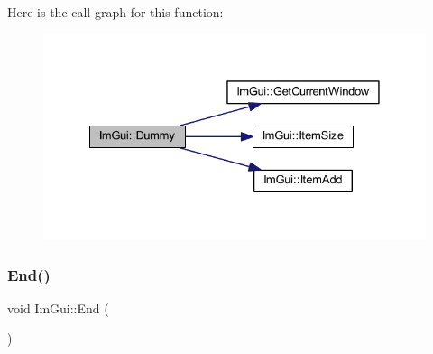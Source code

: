 Here is the call graph for this function\+:
\nopagebreak
\begin{figure}[H]
\begin{center}
\leavevmode
\includegraphics[width=328pt]{namespace_im_gui_a8b0fb07113251301ff897b8578a53f34_cgraph}
\end{center}
\end{figure}
\mbox{\label{namespace_im_gui_a5479d93794a004c67ceb6d13f37c8254}} 
\subsubsection{\texorpdfstring{End()}{End()}}
{\footnotesize\ttfamily void Im\+Gui\+::\+End (\begin{DoxyParamCaption}{ }\end{DoxyParamCaption})}

